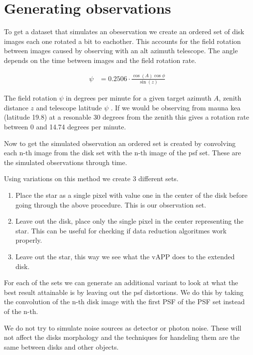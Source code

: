 




\section{Generating observations}
\label{sec:gen}
To get a dataset that simulates an obeservation we create an ordered set of disk images each one rotated a bit to eachother. This accounts for the field rotation between images caused by observing with an alt azimuth telescope. The angle depends on the time between images and the field rotation rate.

\begin{align}
  \psi &= 0.2506 \cdot \frac{\cos(A) \cos \phi}{\sin(z)} 
\end{align}

The field rotation $\psi$ in degrees per minute for a given target azimuth $A$, zenith distance $z$ and telescope latitude $\psi$ \cite[page 95]{Electronic_imaging}. If we would be observing from mauna kea (latitude 19.8) at a resonable 30 degrees from the zenith this gives a rotation rate between 0 and  14.74 degrees per minute.

Now to get the simulated observation an ordered set is created by convolving each n-th image from the disk set with the n-th image of the psf set. These are the simulated observations through time. 

Using variations on this method we create 3 different sets.

\begin{enumerate}
\item Place the star as a single pixel with value one in the center of the disk before going through the above procedure. This is our observation set.
\item Leave out the disk, place only the single pixel in the center representing the star. This can be useful for checking if data reduction algoritmes work properly.
\item Leave out the star, this way we see what the \ac{vAPP} does to the extended disk.
\end{enumerate}

For each of the sets we can generate an additional variant to look at what the best result attainable is by leaving out the psf distortions. We do this by taking the convolution of the n-th disk image with the first \ac{PSF} of the \ac{PSF} set instead of the n-th.

We do not try to simulate noise sources as detector or photon noise. These will not affect the disks morphology and the techniques for handeling them are the same between disks and other objects.
